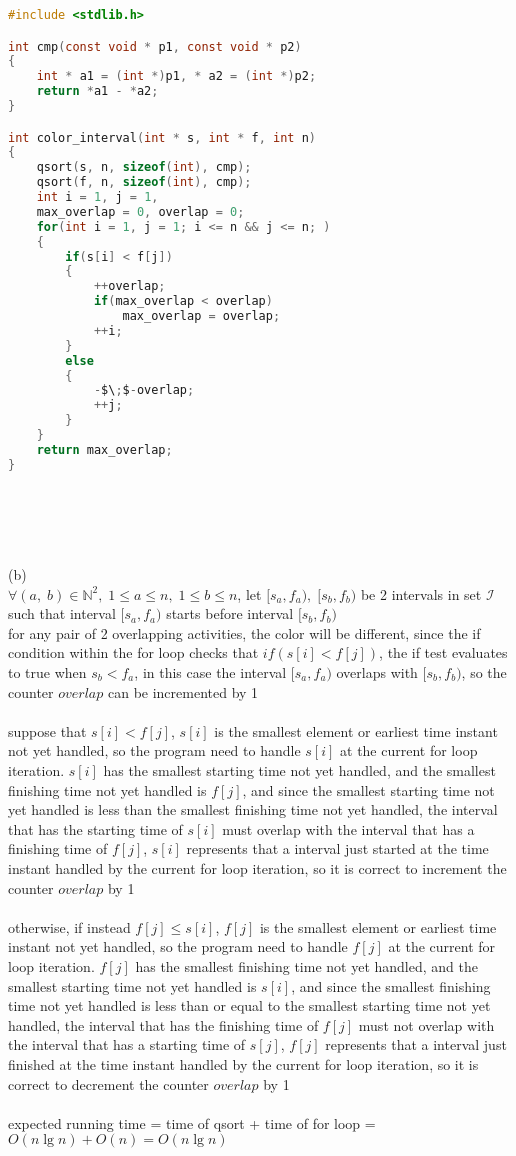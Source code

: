 \documentclass[12pt,border=4pt,multi]{article} %
\begin{document}
\begin{lstlisting}[language = c, mathescape = true]
#include <stdlib.h>

int cmp(const void * p1, const void * p2)
{
    int * a1 = (int *)p1, * a2 = (int *)p2;
    return *a1 - *a2;
}

int color_interval(int * s, int * f, int n)
{
    qsort(s, n, sizeof(int), cmp);
    qsort(f, n, sizeof(int), cmp);
    int i = 1, j = 1, 
    max_overlap = 0, overlap = 0;
    for(int i = 1, j = 1; i <= n && j <= n; )
    {
        if(s[i] < f[j])
        {
            ++overlap;
            if(max_overlap < overlap)
                max_overlap = overlap;
            ++i;
        }
        else
        {
            -$\;$-overlap;
            ++j;
        }
    }
    return max_overlap;
}
\end{lstlisting}
\leavevmode
\\
\\
\\
\\
(b)\\
$\forall (a,\; b) \in \mathbb{N}^2,\; 1 \leq a \leq n,\; 1 \leq b \leq n$, let $[s_a, f_a),\; [s_b, f_b)$ be 2 intervals in set $\mathcal{I}$ such that interval $[s_a, f_a)$ starts before interval $[s_b, f_b)$\\
for any pair of 2 overlapping activities, the color will be different, since the if condition within the for loop checks that $if(s[i] < f[j])$, the if test evaluates to true when $s_b < f_a$, in this case the interval $[s_a, f_a)$ overlaps with $[s_b, f_b)$, so the counter $overlap$ can be incremented by 1\\
\\
suppose that $s[i] < f[j]$, $s[i]$ is the smallest element or earliest time instant not yet handled, so the program need to handle $s[i]$ at the current for loop iteration. $s[i]$ has the smallest starting time not yet handled, and the smallest finishing time not yet handled is $f[j]$, and since the smallest starting time not yet handled is less than the smallest finishing time not yet handled, the interval that has the starting time of $s[i]$ must overlap with the interval that has a finishing time of $f[j]$, $s[i]$ represents that a interval just started at the time instant handled by the current for loop iteration, so it is correct to increment the counter $overlap$ by 1\\
\\
otherwise, if instead $f[j] \leq s[i]$, $f[j]$ is the smallest element or earliest time instant not yet handled, so the program need to handle $f[j]$ at the current for loop iteration. $f[j]$ has the smallest finishing time not yet handled, and the smallest starting time not yet handled is $s[i]$, and since the smallest finishing time not yet handled is less than or equal to the smallest starting time not yet handled, the interval that has the finishing time of $f[j]$ must not overlap with the interval that has a starting time of $s[j]$, $f[j]$ represents that a interval just finished at the time instant handled by the current for loop iteration, so it is correct to decrement the counter $overlap$ by 1\\
\\
expected running time = time of qsort + time of for loop = $O(n \lg n) + O(n) = O(n \lg n)$\\
\end{document}
